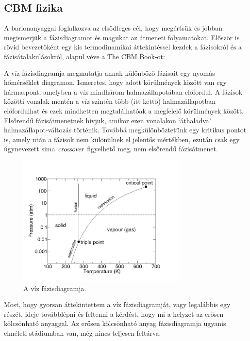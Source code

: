 \documentclass[a4paper,12pt]{article}
\begin{document}
\subsection{ CBM fizika }
\vspace{5mm}
\par A barionanyaggal foglalkozva az elsődleges cél, hogy megértsük és jobban megismerjük a fázisdiagramot és magukat az átmeneti folyamatokat.
Először is rövid bevezetőként egy kis termodinamikai áttekintéssel kezdek a fázisokról és a fázisátalakulásokról, alapul véve a The CBM Book-ot:
\vspace{5mm}
\par A víz fázisdiagramja megmutatja annak különböző fázisait egy nyomás-hőmérséklet diagramon. Ismeretes, hogy adott körülmények között van egy
hármaspont, amelyben a víz mindhárom halmazállapotában előfordul. A fázisok közötti vonalak mentén a víz szintén több (itt kettő) halmazállapotban
előfordulhat és ezek mindketten megtalálhatóak a megfelelő körülmények között. Elsőrendű fázisátmenetnek hívjuk, amikor ezen vonalakon `áthaladva' halmazállapot-változás
történik. Továbbá megkülönböztetünk egy kritikus pontot is, amely után a fázisok nem különülnek el jelentős mértékben, ezután
csak egy úgynevezett sima $\textsl{crossover}$ figyelhető meg, nem elsőrendű fázisátmenet.
\begin{figure}[H]
	\centering
	\includegraphics[width=0.76\textwidth]{water_phase.jpg}
	\caption{ A víz fázisdiagramja. }
\end{figure}
\par Most, hogy gyorsan áttekintettem a víz fázisdiagramját, vagy legalábbis egy részét, ideje továbblépni és feltenni a kérdést, hogy mi 
a helyzet az erősen kölcsönható anyaggal. Az erősen kölcsönható anyag fázisdiagramja ugyanis elméleti stádiumban van, még nincs teljesen feltárva.
\end{document}
